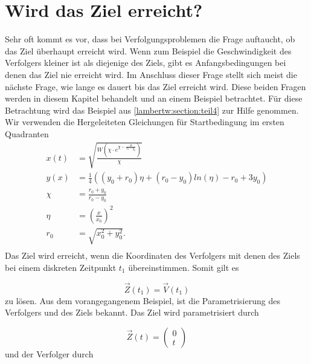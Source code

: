 %
%
%
\section{Wird das Ziel erreicht?
\label{lambertw:section:Wird_das_Ziel_erreicht}}

Sehr oft kommt es vor, dass bei Verfolgungsproblemen die Frage auftaucht, ob das Ziel überhaupt erreicht wird.
Wenn zum Beispiel die Geschwindigkeit des Verfolgers kleiner ist als diejenige des Ziels, gibt es Anfangsbedingungen bei denen das Ziel nie erreicht wird.
Im Anschluss dieser Frage stellt sich meist die nächste Frage, wie lange es dauert bis das Ziel erreicht wird.
Diese beiden Fragen werden in diesem Kapitel behandelt und an einem Beispiel betrachtet.
%
Für diese Betrachtung wird das Beispiel aus \eqref{lambertw:section:teil4} zur Hilfe genommen.
Wir verwenden die Hergeleiteten Gleichungen für Startbedingung im ersten Quadranten
\begin{align*}
    x\left(t\right)
    &=
    \sqrt{\frac{W\left(\chi\cdot e^{\chi-\frac{4t}{r_0-y_0}}\right)}{\chi}} \\
    y(x)
    &=
    \frac{1}{4}\left(\left(y_0+r_0\right)\eta+\left(r_0-y_0\right)ln\left(\eta\right)-r_0+3y_0\right) \\
    \chi
    &=
    \frac{r_0+y_0}{r_0-y_0}\\
    \eta
    &=
    \left(\frac{x}{x_0}\right)^2 
    \\
    r_0
    &=
    \sqrt{x_0^2+y_0^2} \text{.}\\
\end{align*}
%
Das Ziel wird erreicht, wenn die Koordinaten des Verfolgers mit denen des Ziels bei einem diskreten Zeitpunkt $t_1$ übereinstimmen.
Somit gilt es

\begin{equation*}
    \vec{Z}(t_1)=\vec{V}(t_1)
\end{equation*}
%
zu lösen.
Aus dem vorangegangenem Beispiel, ist die Parametrisierung des Verfolgers und des Ziels bekannt.
Das Ziel wird parametrisiert durch

\begin{equation}
    \vec{Z}(t)
    =
    \left( \begin{array}{c} 0 \\ t \end{array} \right)
\end{equation}
%
und der Verfolger durch

